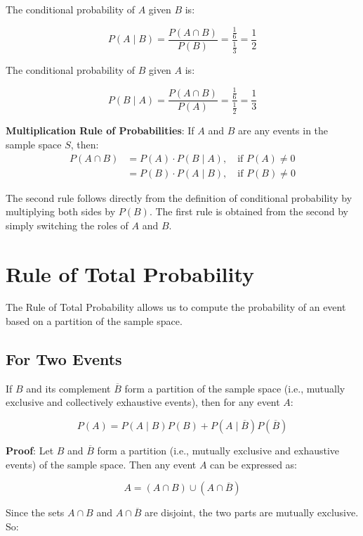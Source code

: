 \documentclass[twoside]{book}
\begin{document}
The conditional probability of \( A \) given \( B \) is:

\[
P(A \mid B) = \frac{P(A \cap B)}{P(B)} = \dfrac{\frac{1}{6}}{\frac{1}{3}}  = \frac{1}{2}
\]

The conditional probability of \( B \) given \( A \) is:

\[
P(B \mid A) = \frac{P(A \cap B)}{P(A)} =\frac{\frac{1}{6}}{\frac{1}{2}} = \frac{1}{3}
\]

\begin{textbox}
\textbf{Multiplication Rule of Probabilities}: If \( A \) and \( B \) are any events in the sample space \( S \), then:
\begin{align*}
    P(A \cap B) &= P(A) \cdot P(B \mid A), \quad \text{if } P(A) \neq 0 \\
 &= P(B) \cdot P(A \mid B), \quad \text{if } P(B) \neq 0
\end{align*}
\end{textbox}
The second rule follows directly from the definition of conditional probability by multiplying both sides by \( P(B) \).  
The first rule is obtained from the second by simply switching the roles of \( A \) and \( B \).

\section{Rule of Total Probability}

The Rule of Total Probability allows us to compute the probability of an event based on a partition of the sample space.

\subsection{For Two Events}
\begin{textbox}
    If \( B \) and its complement \( \overline{B} \) form a partition of the sample space (i.e., mutually exclusive and collectively exhaustive events), then for any event \( A \):

\[
P(A) = P(A \mid B)P(B) + P(A \mid \overline{B})P(\overline{B})
\]
\end{textbox}
\textbf{Proof}: Let \( B \) and \( \overline{B} \) form a partition (i.e., mutually exclusive and exhaustive events) of the sample space. Then any event \( A \) can be expressed as:

\[
A = (A \cap B) \cup (A \cap \overline{B})
\]

Since the sets \( A \cap B \) and \( A \cap \overline{B} \) are disjoint, the two parts are mutually exclusive. So:
\end{document}
